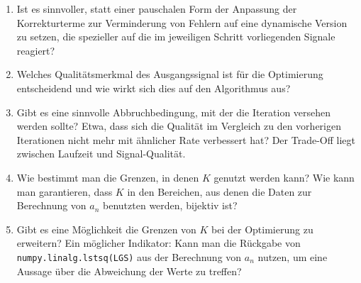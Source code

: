 \documentclass[../Report.tex]{subfiles}
\begin{document}
\begin{enumerate}
	\item 	Ist es sinnvoller, statt einer pauschalen Form der Anpassung der Korrekturterme zur Verminderung von Fehlern auf eine dynamische Version zu setzen, die spezieller auf die im jeweiligen Schritt vorliegenden Signale reagiert?
	
	\item	Welches Qualitätsmerkmal des Ausgangssignal ist für die Optimierung entscheidend und wie wirkt sich dies auf den Algorithmus aus?
	
	\item	Gibt es eine sinnvolle Abbruchbedingung, mit der die Iteration versehen werden sollte? Etwa, dass sich die Qualität im Vergleich zu den vorherigen Iterationen nicht mehr mit ähnlicher Rate verbessert hat? Der Trade-Off liegt zwischen Laufzeit und Signal-Qualität.
	
	\item	Wie bestimmt man die Grenzen, in denen $K$ genutzt werden kann? Wie kann man garantieren, dass $K$ in den Bereichen, aus denen die Daten zur Berechnung von $a_n$ benutzten werden, bijektiv ist?
	
	\item	Gibt es eine Möglichkeit die Grenzen von $K$ bei der Optimierung zu erweitern? Ein möglicher Indikator: Kann man die Rückgabe von \lstinline{numpy.linalg.lstsq(LGS)} aus der Berechnung von $a_n$ nutzen, um eine Aussage über die Abweichung der Werte zu treffen?
\end{enumerate}
\end{document}
